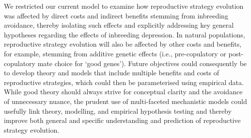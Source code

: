 \documentclass[12pt]{article}
\begin{document}
We restricted our current model to examine how reproductive strategy evolution was affected by direct costs and indirect benefits stemming from inbreeding avoidance, thereby isolating such effects and explicitly addressing key general hypotheses regarding the effects of inbreeding depression. In natural populations, reproductive strategy evolution will also be affected by other costs and benefits, for example, stemming from additive genetic effects (i.e., pre-copulatory or post-copulatory mate choice for `good genes'). Future objectives could consequently be to develop theory and models that include multiple benefits and costs of reproductive strategies, which could then be parameterised using empirical data. While good theory should always strive for conceptual clarity and the avoidance of unnecessary nuance, the prudent use of multi-faceted mechanistic models could usefully link theory, modelling, and empirical hypothesis testing and thereby improve both general and specific understanding and prediction of reproductive strategy evolution.





\end{document}

